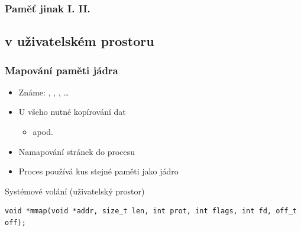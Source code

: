 
\begin{frame}
  \frametitle{Paměť jinak \iffimuni I. \else II. \fi}


   \fi

\end{frame}


\iffimuni
\subsection{ v uživatelském prostoru}
\fi

\begin{frame}[fragile]
  \frametitle{Mapování paměti jádra}

    \begin{itemize}
      \item Známe: , , , \dots

      \pause

      \item U všeho nutné kopírování dat
      \begin{itemize}
	\item {} apod.
      \end{itemize}
  \end{itemize}

  \pause
  \bigskip

  \begin{itemize}
    \item Namapování stránek do procesu
    \item Proces používá kus stejné paměti jako jádro
  \end{itemize}

  \pause

  \begin{block}{Systémové volání  (uživatelský prostor)}
  \begin{lstlisting}
void *mmap(void *addr, size_t len, int prot, int flags, int fd, off_t off);
  \end{lstlisting}
  \end{block}

\end{frame}

